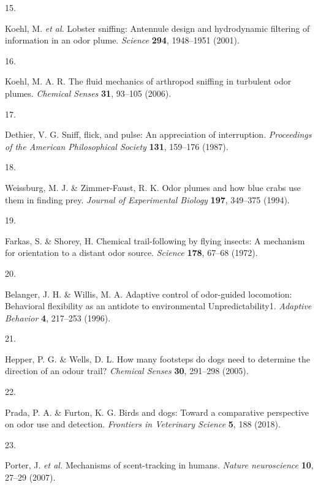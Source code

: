 \documentclass[
]{article}
\newlength{\cslhangindent}
\newlength{\csllabelwidth}
\newlength{\cslentryspacingunit} %
\newenvironment{CSLReferences}[2] %
 {%
  \setlength{\parindent}{0pt}
  \ifodd #1
  \let\oldpar\par
  \def\par{\hangindent=\cslhangindent\oldpar}
  \fi
  \setlength{\parskip}{#2\cslentryspacingunit}
 }%
 {}
\newcommand{\CSLLeftMargin}[1]{\parbox[t]{\csllabelwidth}{#1}}
\newcommand{\CSLRightInline}[1]{\parbox[t]{\linewidth - \csllabelwidth}{#1}\break}
\begin{document}
\begin{CSLReferences}{0}{0}
\leavevmode{}%
\CSLLeftMargin{15. }%
\CSLRightInline{Koehl, M. \emph{et al.} Lobster sniffing: Antennule design and hydrodynamic filtering of information in an odor plume. \emph{Science} \textbf{294}, 1948--1951 (2001).}

\leavevmode{}%
\CSLLeftMargin{16. }%
\CSLRightInline{Koehl, M. A. R. The fluid mechanics of arthropod sniffing in turbulent odor plumes. \emph{Chemical Senses} \textbf{31}, 93--105 (2006).}

\leavevmode{}%
\CSLLeftMargin{17. }%
\CSLRightInline{Dethier, V. G. Sniff, flick, and pulse: An appreciation of interruption. \emph{Proceedings of the American Philosophical Society} \textbf{131}, 159--176 (1987).}

\leavevmode{}%
\CSLLeftMargin{18. }%
\CSLRightInline{Weissburg, M. J. \& Zimmer-Faust, R. K. Odor plumes and how blue crabs use them in finding prey. \emph{Journal of Experimental Biology} \textbf{197}, 349--375 (1994).}

\leavevmode{}%
\CSLLeftMargin{19. }%
\CSLRightInline{Farkas, S. \& Shorey, H. Chemical trail-following by flying insects: A mechanism for orientation to a distant odor source. \emph{Science} \textbf{178}, 67--68 (1972).}

\leavevmode{}%
\CSLLeftMargin{20. }%
\CSLRightInline{Belanger, J. H. \& Willis, M. A. Adaptive control of odor-guided locomotion: Behavioral flexibility as an antidote to environmental Unpredictability1. \emph{Adaptive Behavior} \textbf{4}, 217--253 (1996).}

\leavevmode{}%
\CSLLeftMargin{21. }%
\CSLRightInline{Hepper, P. G. \& Wells, D. L. How many footsteps do dogs need to determine the direction of an odour trail? \emph{Chemical Senses} \textbf{30}, 291--298 (2005).}

\leavevmode{}%
\CSLLeftMargin{22. }%
\CSLRightInline{Prada, P. A. \& Furton, K. G. Birds and dogs: Toward a comparative perspective on odor use and detection. \emph{Frontiers in Veterinary Science} \textbf{5}, 188 (2018).}

\leavevmode{}%
\CSLLeftMargin{23. }%
\CSLRightInline{Porter, J. \emph{et al.} Mechanisms of scent-tracking in humans. \emph{Nature neuroscience} \textbf{10}, 27--29 (2007).}


\end{CSLReferences}
\end{document}
